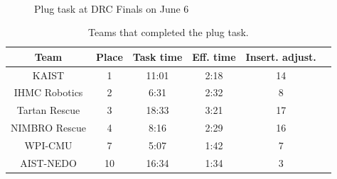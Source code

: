 \begin{figure}[t]
			\\
			\hspace{0.1cm}
			\caption{Plug task at DRC Finals on June 6~\cite{DARPA}}
			\label{fig:plug-drc}
		\end{figure}
		
		\begin{table}[t]
			\caption{Teams that completed the plug task.}
			\label{tab:teams}
			\centering
			\begin{tabular}{cccccc}
				\hline
				Team 					& Place	& Task time	& Eff. time & Insert. adjust.	\\
				\hline
				KAIST					& 1			& 11:01	& 2:18			& 14				\\
				IHMC Robotics	& 2			& 6:31	& 2:32			& 8					\\
				Tartan Rescue	& 3			& 18:33	& 3:21			& 17				\\
				NIMBRO Rescue	& 4			& 8:16	& 2:29			& 16				\\
				WPI-CMU				& 7			& 5:07	& 1:42			& 7					\\
				AIST-NEDO			& 10		& 16:34	& 1:34			& 3					\\
				\hline
			\end{tabular}
		\end{table}